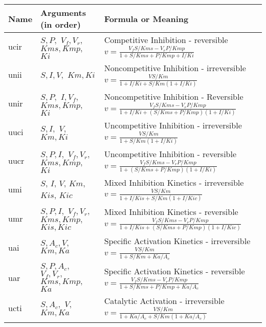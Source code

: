 \documentclass[10pt]{article}
\begin{document}
\addtocounter{table}{-1}
\begin{table}[h]
\begin{tabular}{|p{1cm}|p{2cm}|p{13cm}|}
\hline
Name & Arguments (in order) & Formula or Meaning \\ \hline

ucir & $ S, P, $ $ V_f, V_r, $ $ Kms, Kmp, $ $ Ki $ & Competitive
Inhibition - reversible $ v = \frac{V_f S/Kms - V_r P/Kmp}{1 +
S/Kms + P/Kmp + I/Ki} $ \\ \hline

unii & $ S, I, V, $ $ Km, Ki $ & Noncompetitive Inhibition -
irreversible $ v
= \frac{V S/Km}{1 + I/Ki + S/Km \left( 1 + I/Ki\right) } $ \\
\hline

unir & $ S, P, $ $ I, V_f, $ $ Kms, Kmp, $ $ Ki $ & Noncompetitive
Inhibition - Reversible $ v = \frac{V_f S/Kms - V_r P/Kmp}{1 +
I/Ki + \left( S/Kms + P/Kmp \right) \left( 1 + I/Ki\right) } $   \\
\hline

uuci & $ S, I, $ $ V,$ $ Km, Ki $ & Uncompetitive Inhibition -
irreversible $ v = \frac{V S/Km}{1 + S/Km \left( 1 + I/Ki\right)
} $\\ \hline

uucr & $ S, P, I, $ $ V_f, V_r, $ $ Kms, Kmp, $ $ Ki $ &
Uncompetitive Inhibition - reversible $ v = \frac{V_f S/Kms - V_r
P/Kmp}{1 + \left( S/Kms + P/Kmp \right) \left( 1 + I/Ki\right) }
$ \\ \hline

umi & $S$, $I$, $V$, $Km$, $Kis$, $Kic$ & Mixed Inhibition
Kinetics - irreversible $ v
= \frac{V S/Km}{1 + I/Kis + S/Km \left( 1 + I/Kic \right) } $ \\
\hline

umr & $ S, P, I,$ $ V_f, V_r, $ $ Kms, Kmp, $ $ Kis, Kic $ & Mixed
Inhibition Kinetics - reversible $ v = \frac{V_f S/Kms - V_r
P/Kmp}{1 + I/Kis + \left( S/Kms + P/Kmp \right) \left( 1 + I/Kic
\right) } $ \\ \hline

uai & $ S, A_c, V, $ $ Km, Ka $ & Specific Activation Kinetics -
irreversible $ v = \frac{V S/Km}{1 + S/Km + Ka/A_c} $ \\ \hline

uar & $ S, P, A_c, $ $ V_f, V_r, $ $ Kms, Kmp, $ $Ka $ & Specific
Activation Kinetics - reversible $ v
= \frac{V_f S/Kms - V_r P/Kmp}{1 + S/Kms + P/Kmp + Ka/A_c} $ \\
\hline

ucti & $ S, A_c, $ $ V, $ $ Km, Ka $ & Catalytic Activation -
irreversible
$ v = \frac{V S/Km}{1 + Ka/A_c + S/Km \left( 1 + Ka/A_c\right)} $\\
\hline


\end{tabular}
\end{table}
\end{document}
